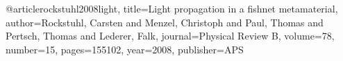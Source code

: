 \cite{croenne2009left}

\cite{wang2010experimental} %

\cite{navarro2011dual} %

\cite{valentine2011development}

\cite{yahiaoui2012metallo} %
%

@article{rockstuhl2008light,
  title={Light propagation in a fishnet metamaterial},
  author={Rockstuhl, Carsten and Menzel, Christoph and Paul, Thomas and Pertsch, Thomas and Lederer, Falk},
  journal={Physical Review B},
  volume={78},
  number={15},
  pages={155102},
  year={2008},
  publisher={APS}
}
%

